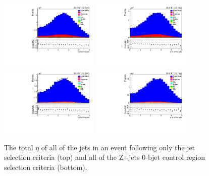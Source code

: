 \begin{figure}[ht]
\centering
\includegraphics[width=0.42\textwidth]{figs/background-estimation/plots/unblinded/DY_control_old_prompt_ee_DYamcatnlo/totalJetEta_SingleTop_jetSel_ee.pdf}
\includegraphics[width=0.42\textwidth]{figs/background-estimation/plots/unblinded/DY_control_old_prompt_mumu_DYamcatnlo/totalJetEta_SingleTop_jetSel_mumu.pdf}
\\
\includegraphics[width=0.42\textwidth]{figs/background-estimation/plots/unblinded/DY_control_old_prompt_ee_DYamcatnlo/totalJetEta_SingleTop_wMass_ee.pdf}
\includegraphics[width=0.42\textwidth]{figs/background-estimation/plots/unblinded/DY_control_old_prompt_mumu_DYamcatnlo/totalJetEta_SingleTop_wMass_mumu.pdf}
\caption{
The total $\eta$ of all of the jets in an event following only the jet selection criteria (top) and all of the Z+jets 0-bjet control region selection criteria (bottom).
}
\label{fig:App_CR_NLO_totalJetEta}
\end{figure}

